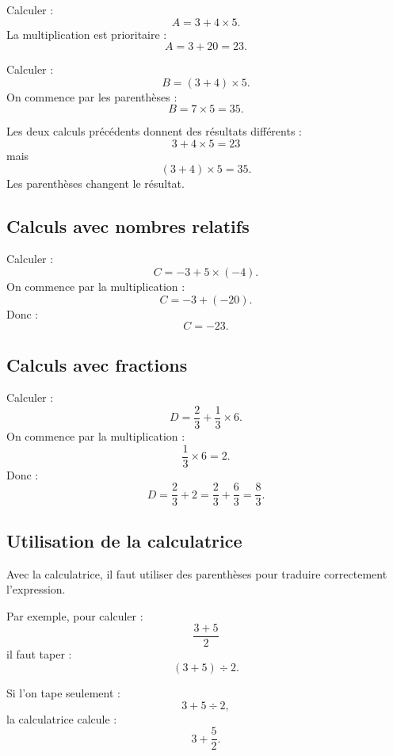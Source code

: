 \documentclass[11pt,a4paper]{article}
\begin{document}
\begin{exemple}
Calculer :
\[
A=3+4\times 5.
\]
La multiplication est prioritaire :
\[
A=3+20=23.
\]
\end{exemple}

\begin{exemple}
Calculer :
\[
B=(3+4)\times 5.
\]
On commence par les parenthèses :
\[
B=7\times 5=35.
\]
\end{exemple}

\begin{attention}
Les deux calculs précédents donnent des résultats différents :
\[
3+4\times 5=23
\]
mais
\[
(3+4)\times 5=35.
\]
Les parenthèses changent le résultat.
\end{attention}

\subsection{Calculs avec nombres relatifs}

\begin{exemple}
Calculer :
\[
C=-3+5\times(-4).
\]
On commence par la multiplication :
\[
C=-3+(-20).
\]
Donc :
\[
C=-23.
\]
\end{exemple}

\subsection{Calculs avec fractions}

\begin{exemple}
Calculer :
\[
D=\frac{2}{3}+\frac{1}{3}\times 6.
\]
On commence par la multiplication :
\[
\frac{1}{3}\times 6=2.
\]
Donc :
\[
D=\frac{2}{3}+2=\frac{2}{3}+\frac{6}{3}=\frac{8}{3}.
\]
\end{exemple}

\subsection{Utilisation de la calculatrice}

\begin{methode}
Avec la calculatrice, il faut utiliser des parenthèses pour traduire correctement l'expression.

Par exemple, pour calculer :
\[
\frac{3+5}{2}
\]
il faut taper :
\[
(3+5)\div 2.
\]

Si l'on tape seulement :
\[
3+5\div 2,
\]
la calculatrice calcule :
\[
3+\frac{5}{2}.
\]
\end{methode}
\end{document}
